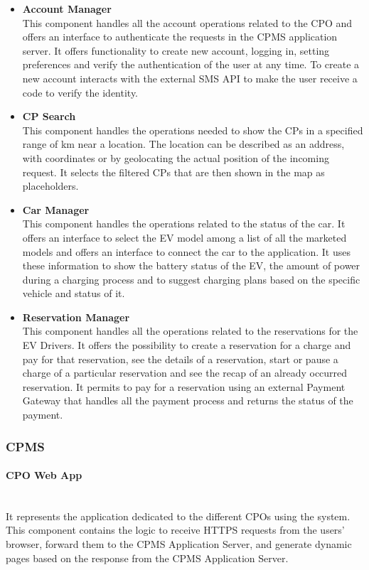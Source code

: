 \begin{itemize}
    \item \textbf{Account Manager} \\ This component handles all the account operations related to the CPO and offers an interface to authenticate
          the requests in the CPMS application server.
          It offers functionality to create new account, logging in, setting preferences and verify the authentication of the user at any time.
          To create a new account interacts with the external SMS API to make the user receive a code to verify the identity.
    \item \textbf{CP Search} \\ This component handles the operations needed to show the CPs in a specified range of km near a location. The location
        can be described as an address, with coordinates or by geolocating the actual position of the incoming request. It selects the filtered CPs that are then 
        shown in the map as placeholders.  
    \item \textbf{Car Manager} \\ This component handles the operations related to the status of the car. It offers an interface to select the EV model among a list of 
        all the marketed models and offers an interface to connect the car to the application. It uses these information to show the battery status of the EV, the 
        amount of power during a charging process and to suggest charging plans based on the specific vehicle and status of it.
    \item \textbf{Reservation Manager} \\ This component handles all the operations related to the reservations for the EV Drivers. It offers the possibility to create a reservation
    for a charge and pay for that reservation, see the details of a reservation, start or pause a charge of a particular reservation and see the recap of an already occurred reservation.
    It permits to pay for a reservation using an external Payment Gateway that handles all the payment process and returns the status of the payment.  

\end{itemize}


\subsubsection{CPMS}

\paragraph*{CPO Web App} \hfill \\
It represents the application dedicated to the different CPOs using the system. This component contains the logic to receive HTTPS requests from the users' browser,
forward them to the CPMS Application Server, and generate dynamic pages based on the response from the CPMS Application Server.

